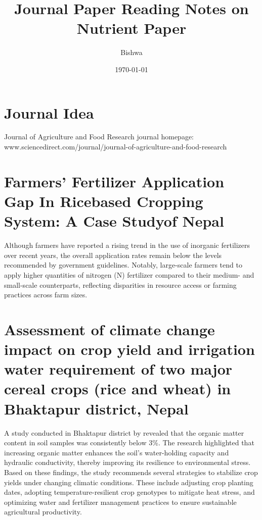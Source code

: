 \documentclass[a4paper,12pt]{article}
\title{Journal Paper Reading Notes on Nutrient Paper}
\author{Bishwa}
\date{\today}
\begin{document}
\maketitle

\section{Journal Idea}
Journal of Agriculture and Food Research  journal homepage: www.sciencedirect.com/journal/journal-of-agriculture-and-food-research

\section{Farmers’ Fertilizer Application Gap In Ricebased Cropping System: A Case Studyof Nepal}
\parencite{baralFarmersFertilizerApplication2020}
Although farmers have reported a rising trend in the use of inorganic fertilizers over recent years, the overall application rates remain below the levels recommended by government guidelines. Notably, large-scale farmers tend to apply higher quantities of nitrogen (N) fertilizer compared to their medium- and small-scale counterparts, reflecting disparities in resource access or farming practices across farm sizes.


\section{Assessment of climate change impact on crop yield and irrigation water requirement of two major cereal crops (rice and wheat) in Bhaktapur district, Nepal}

\parencite{shresthaAssessmentClimateChange2017}

A study conducted in Bhaktapur district by \parencite{shresthaAssessmentClimateChange2017} revealed that the organic matter content in soil samples was consistently below 3\%. The research highlighted that increasing organic matter enhances the soil’s water-holding capacity and hydraulic conductivity, thereby improving its resilience to environmental stress.
Based on these findings, the study recommends several strategies to stabilize crop yields under changing climatic conditions. These include adjusting crop planting dates, adopting temperature-resilient crop genotypes to mitigate heat stress, and optimizing water and fertilizer management practices to ensure sustainable agricultural productivity.
\end{document}
